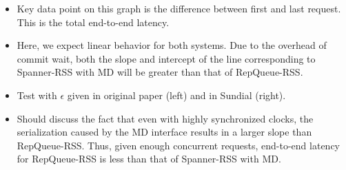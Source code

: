 \documentclass[letterpaper, 11pt]{article}
\begin{document}
\begin{itemize}
\item Key data point on this graph is the difference between first and last request. This is the total end-to-end latency. 
\item Here, we expect linear behavior for both systems. Due to the overhead of commit wait, both the slope and intercept of the line corresponding to Spanner-RSS with MD will be greater than that of RepQueue-RSS.
\item Test with $\epsilon$ given in original paper (left) and in Sundial (right).
\item Should discuss the fact that even with highly synchronized clocks, the serialization caused by the MD interface results in a larger slope than RepQueue-RSS. Thus, given enough concurrent requests, end-to-end latency for RepQueue-RSS is less than that of Spanner-RSS with MD.
\end{itemize}
\end{document}
